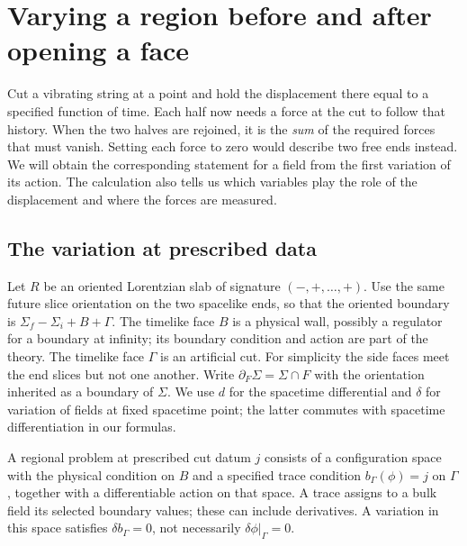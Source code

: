 \chapter{Varying a region before and after opening a face}\label{ch:04}
Cut a vibrating string at a point and hold the displacement there equal to a
specified function of time. Each half now needs a force at the cut to follow
that history. When the two halves are rejoined, it is the \emph{sum} of the
required forces that must vanish. Setting each force to zero would describe
two free ends instead. We will obtain the corresponding statement for a field
from the first variation of its action. The calculation also tells us which
variables play the role of the displacement and where the forces are measured.

\section{The variation at prescribed data}
Let $R$ be an oriented Lorentzian slab of signature $(-,+,\ldots,+)$.
Use the same future slice orientation on the two spacelike ends, so that the
oriented boundary is $\Sigma_f-\Sigma_i+B+\Gamma$. The timelike face $B$
is a physical wall, possibly a regulator for a boundary at infinity; its
boundary condition and action are part of the theory. The timelike face
$\Gamma$ is an artificial cut. For simplicity the side faces meet the end
slices but not one another. Write $\partial_F\Sigma=\Sigma\cap F$ with the
orientation inherited as a boundary of $\Sigma$. We use $d$ for the spacetime
differential and $\delta$ for variation of fields at fixed spacetime point;
the latter commutes with spacetime differentiation in our formulas.

\begin{definition}
A regional problem at prescribed cut datum $j$ consists of a configuration
space with the physical condition on $B$ and a specified trace condition
$b_\Gamma(\phi)=j$ on $\Gamma$, together with a differentiable action on
that space. A trace assigns to a bulk field its selected boundary values;
these can include derivatives. A variation in this space satisfies
$\delta b_\Gamma=0$, not necessarily $\delta\phi|_\Gamma=0$.
\end{definition}


